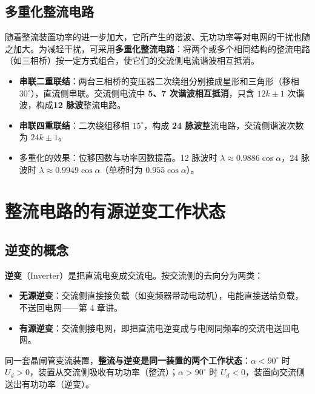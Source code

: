 \subsection{多重化整流电路}

随着整流装置功率的进一步加大，它所产生的谐波、无功功率等对电网的干扰也随之加大。为减轻干扰，可采用\textbf{多重化整流电路}：将两个或多个相同结构的整流电路（如三相桥）按一定方式组合，使它们的交流侧电流谐波相互抵消。

\begin{itemize}
  \item \textbf{串联二重联结}：两台三相桥的变压器二次绕组分别接成星形和三角形（移相 $30^\circ$），直流侧串联。交流侧电流中 \textbf{5、7 次谐波相互抵消}，只含 $12k\pm1$ 次谐波，构成\textbf{12 脉波}整流电路。
  \item \textbf{串联四重联结}：二次绕组移相 $15^\circ$，构成 \textbf{24 脉波}整流电路，交流侧谐波次数为 $24k\pm1$。
  \item 多重化的效果：位移因数与功率因数提高。12 脉波时 $\lambda\approx0.9886\cos\alpha$，24 脉波时 $\lambda\approx0.9949\cos\alpha$（单桥时为 $0.955\cos\alpha$）。
\end{itemize}


\section{整流电路的有源逆变工作状态}

\subsection{逆变的概念}

\textbf{逆变}（Inverter）是把直流电变成交流电。按交流侧的去向分为两类：

\begin{itemize}
  \item \textbf{无源逆变}：交流侧直接接负载（如变频器带动电动机），电能直接送给负载，不送回电网——第 4 章讲。
  \item \textbf{有源逆变}：交流侧接电网，即把直流电逆变成与电网同频率的交流电送回电网。
\end{itemize}

同一套晶闸管变流装置，\textbf{整流与逆变是同一装置的两个工作状态}：$\alpha<90^\circ$ 时 $U_d>0$，装置从交流侧吸收有功功率（整流）；$\alpha>90^\circ$ 时 $U_d<0$，装置向交流侧送出有功功率（逆变）。

